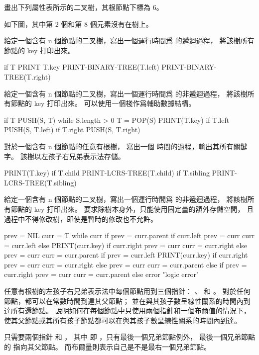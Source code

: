 \startsection[
  title={Representing rooted trees},
  reference={section:represent_rooted_tree},
]

\startEXERCISE
畫出下列屬性表所示的二叉樹，其根節點下標為 6。


\stopEXERCISE

\startANSWER
如下圖，其中第 2 個和第 8 個元素沒有在樹上。

\externalfigure[output/e10_4_1-1]
\stopANSWER

\startEXERCISE
給定一個含有 n 個節點的二叉樹，寫出一個運行時間爲  的遞迴過程，
將該樹所有節點的 key 打印出來。
\stopEXERCISE

\startCLRS
if T
	PRINT T.key
	PRINT-BINARY-TREE(T.left)
	PRINT-BINARY-TREE(T.right)
\stopCLRS

\startEXERCISE
給定一個含有 n 個節點的二叉樹，寫出一個運行時間爲  的非遞迴過程，
將該樹所有節點的 key 打印出來。
可以使用一個棧作爲輔助數據結構。
\stopEXERCISE

\startCLRS
if T
	PUSH(S, T)
while S.length > 0
	T = POP(S)
	PRINT(T.key)
	if T.left
		PUSH(S, T.left)
	if T.right
		PUSH(S, T.right)
\stopCLRS

\startEXERCISE
對於一個含有 n 個節點的任意有根樹，
寫出一個  時間的過程，輸出其所有關鍵字。
該樹以左孩子右兄弟表示法存儲。
\stopEXERCISE

\startANSWER
{}
\startCLRS
PRINT(T.key)
if T.child
	PRINT-LCRS-TREE(T.child)
if T.sibling
	PRINT-LCRS-TREE(T.sibling)
\stopCLRS
\stopANSWER

\startEXERCISE\DIFFICULT
給定一個含有 n 個節點的二叉樹，寫出一個運行時間爲  的非遞迴過程，
將該樹所有節點的 key 打印出來。
要求除樹本身外，只能使用固定量的額外存儲空間，
且過程中不得修改樹，即使是暫時的修改也不允許。
\stopEXERCISE

\startANSWER
{}
\startCLRS
prev = NIL
curr = T
while curr
	if prev = curr.parent
		if curr.left
			prev = curr
			curr = curr.left
		else
			PRINT(curr.key)
			if curr.right
				prev = curr
				curr = curr.right
			else
				prev = curr
				curr = curr.parent
	if prev = curr.left
		PRINT(curr.key)
		if curr.right
			prev = curr
			curr = curr.right
		else
			prev = curr
			curr = curr.parent
	else if prev = curr.right
		prev = curr
		curr = curr.parent
	else
		error "logic error"
\stopCLRS
\stopANSWER

\startEXERCISE\DIFFICULT
任意有根樹的左孩子右兄弟表示法中每個節點用到三個指針： 、  和 。
對於任何節點，都可以在常數時間到達其父節點；
並在與其孩子數呈線性關系的時間內到達所有還節點。
說明如何在每個節點中只使用兩個指針和一個布爾值的情況下，
使其父節點或其所有孩子節點都可以在與其孩子數呈線性關系的時間內到達。
\stopEXERCISE

\startANSWER
只需要兩個指針  和 ，
其中  即 ，只有最後一個兄弟節點例外，
最後一個兄弟節點的  指向其父節點。
而布爾量則表示自己是不是最右一個兄弟節點。
\stopANSWER

\stopsection
